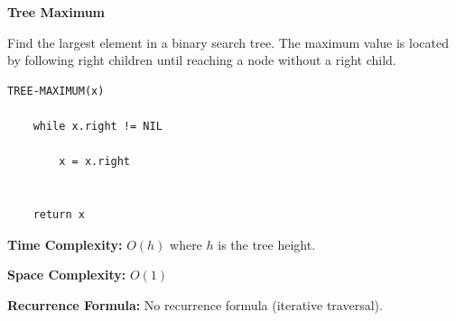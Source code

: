\documentclass[a4paper,12pt]{article}
\begin{document}
\begin{tcolorbox}[
    colback=gray!30,
    colframe=black,
    boxrule=1pt,
    arc=0mm
]

\begin{tcolorbox}[
    colback=gray!10,
    colframe=black,
    arc=0mm
]
\centering
{\Huge\bfseries Tree Maximum}
\end{tcolorbox}


\begin{tcolorbox}[
    colback=gray!10,
    colframe=black,
    arc=0mm
]
\small
Find the largest element in a binary search tree.
The maximum value is located by following right children
until reaching a node without a right child.
\end{tcolorbox}


\begin{tcolorbox}[
    colback=black!5,
    colframe=black,
    arc=0mm,
    title=Pseudo-code
]
\tiny
\begin{lstlisting}
TREE-MAXIMUM(x)

    while x.right != NIL

        x = x.right


    return x
\end{lstlisting}
\end{tcolorbox}


\begin{tcolorbox}[
    colback=cyan!20,
    colframe=black,
    arc=0mm
]
\small
\textbf{Time Complexity:}
$O(h)$ where $h$ is the tree height.
\end{tcolorbox}


\begin{tcolorbox}[
    colback=violet!20,
    colframe=black,
    arc=0mm
]
\small
\textbf{Space Complexity:}
$O(1)$
\end{tcolorbox}


\begin{tcolorbox}[
    colback=pink!20,
    colframe=black,
    arc=0mm
]
\small
\textbf{Recurrence Formula:}
No recurrence formula (iterative traversal).
\end{tcolorbox}

\end{tcolorbox}
\end{document}
